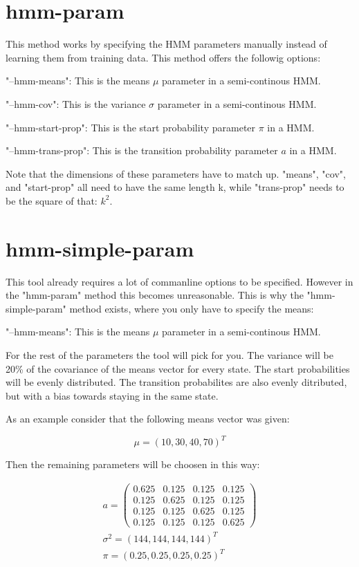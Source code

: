 \section{hmm-param}

This method works by specifying the HMM parameters manually instead of learning them from training data. This method offers the followig options: 

"--hmm-means": This is the means $\mu$ parameter in a semi-continous HMM. 

"--hmm-cov": This is the variance $\sigma$ parameter in a semi-continous HMM. 

"--hmm-start-prop": This is the start probability parameter $\pi$ in a HMM. 

"--hmm-trans-prop": This is the transition probability parameter $a$ in a HMM. 

Note that the dimensions of these parameters have to match up. "means", "cov", and "start-prop" all need to have the same length k, while "trans-prop" needs to be the square of that: $k^2$. 

\section{hmm-simple-param}

This tool already requires a lot of commanline options to be specified. However in the "hmm-param" method this becomes unreasonable. This is why the "hmm-simple-param" method exists, where you only have to specify the means: 

"--hmm-means": This is the means $\mu$ parameter in a semi-continous HMM. 

For the rest of the parameters the tool will pick for you. The variance will be 20\% of the covariance of the means vector for every state. The start probabilities will be evenly distributed. The transition probabilites are also evenly ditributed, but with a bias towards staying in the same state. 

As an example consider that the following means vector was given: 

\begin{equation}
    \mu = (10, 30, 40, 70)^T
\end{equation}

Then the remaining parameters will be choosen in this way:

\begin{equation}
    \begin{split}
    a = 
    \begin{pmatrix}
        0.625 & 0.125 & 0.125 & 0.125 \\
        0.125 & 0.625 & 0.125 & 0.125 \\
        0.125 & 0.125 & 0.625 & 0.125 \\
        0.125 & 0.125 & 0.125 & 0.625
    \end{pmatrix} \\
    \sigma^2 = (144, 144, 144, 144)^T \\
    \pi = (0.25, 0.25, 0.25, 0.25)^T 
\end{split}
\end{equation}

